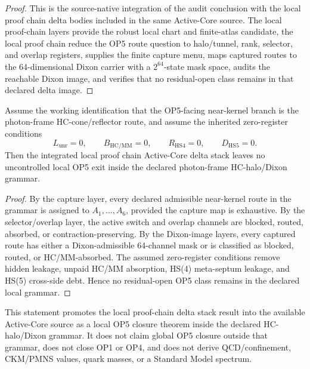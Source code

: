 \begin{proof}
This is the source-native integration of the audit conclusion with the local proof chain delta bodies included in the same Active-Core source. The local proof-chain layers provide the robust local chart and finite-atlas candidate, the local proof chain reduce the OP5 route question to halo/tunnel, rank, selector, and overlap registers, supplies the finite capture menu, maps captured routes to the 64-dimensional Dixon carrier with a \(2^{64}\)-state mask space, audits the reachable Dixon image, and verifies that no residual-open class remains in that declared delta image.
\end{proof}

\begin{theorem}
Assume the working identification that the OP5-facing near-kernel branch is the photon-frame HC-cone/reflector route, and assume the inherited zero-register conditions
\[
L_{\mathrm{unr}}=0,
\qquad
B_{\mathrm{HC/MM}}=0,
\qquad
R_{\mathrm{HS4}}=0,
\qquad
D_{\mathrm{HS5}}=0.
\]
Then the integrated local proof chain Active-Core delta stack leaves no uncontrolled local OP5 exit inside the declared photon-frame HC-halo/Dixon grammar.
\end{theorem}

\begin{proof}
By the capture layer, every declared admissible near-kernel route in the grammar is assigned to \(A_1,\ldots,A_6\), provided the capture map is exhaustive. By the selector/overlap layer, the active switch and overlap channels are blocked, routed, absorbed, or contraction-preserving. By the Dixon-image layers, every captured route has either a Dixon-admissible 64-channel mask or is classified as blocked, routed, or HC/MM-absorbed. The assumed zero-register conditions remove hidden leakage, unpaid HC/MM absorption, HS(4) meta-septum leakage, and HS(5) cross-side debt. Hence no residual-open OP5 class remains in the declared local grammar.
\end{proof}

\begin{remark}
This statement promotes the local proof-chain delta stack result into the available Active-Core source as a local OP5 closure theorem inside the declared HC-halo/Dixon grammar. It does not claim global OP5 closure outside that grammar, does not close OP1 or OP4, and does not derive QCD/confinement, CKM/PMNS values, quark masses, or a Standard Model spectrum.
\end{remark}

